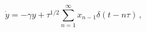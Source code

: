 \begin{equation}
\dot{y} = - \gamma y 
        + \tau^{1/2} \sum_{n=1}^\infty x_{n-1} \delta(t-n\tau) \, ,
\label{eq7}
\end{equation}

